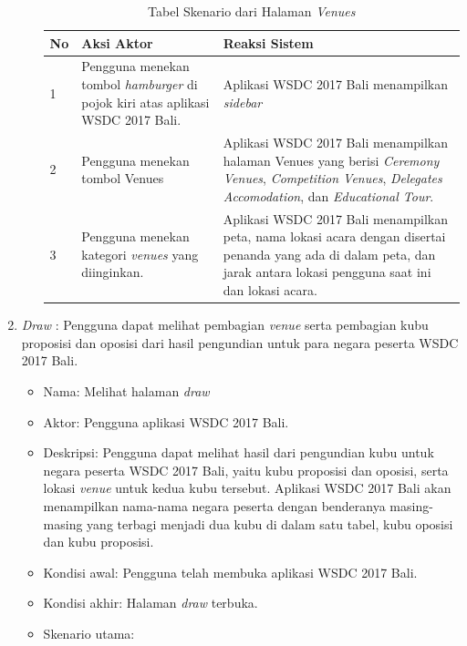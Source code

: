 \begin{enumerate}
\begin{itemize}
\begin{table}[H]
			\centering
			\begin{tabular}{|p{0.5cm}|p{7cm}|p{7cm}|}
				\hline
				No & Aksi Aktor                               & Reaksi Sistem                                          \\ \hline
				1  & Pengguna menekan tombol {\it hamburger} di pojok kiri atas aplikasi WSDC 2017 Bali. & Aplikasi WSDC 2017 Bali menampilkan {\it sidebar} \\ \hline
				2  & Pengguna menekan tombol Venues & Aplikasi WSDC 2017 Bali menampilkan halaman Venues yang berisi {\it Ceremony Venues}, {\it Competition Venues}, {\it Delegates Accomodation}, dan {\it Educational Tour}.\\ \hline
				3  & Pengguna menekan kategori {\it venues} yang diinginkan. & Aplikasi WSDC 2017 Bali menampilkan peta, nama lokasi acara dengan disertai penanda yang ada di dalam peta, dan jarak antara lokasi pengguna saat ini dan lokasi acara.\\ \hline
			\end{tabular}
			\caption{Tabel Skenario dari Halaman {\it Venues}}
			\label{table:skenarioHalamanVenues}
		\end{table}
	\end{itemize}
\newpage
	\item {\it Draw} : Pengguna dapat melihat pembagian {\it venue} serta pembagian kubu proposisi dan oposisi dari hasil pengundian untuk para negara peserta WSDC 2017 Bali.
	\begin{itemize}
		\item Nama: Melihat halaman {\it draw}
		\item Aktor: Pengguna aplikasi WSDC 2017 Bali.
		\item Deskripsi: Pengguna dapat melihat hasil dari pengundian kubu untuk negara peserta WSDC 2017 Bali, yaitu kubu proposisi dan oposisi, serta lokasi {\it venue} untuk kedua kubu tersebut. Aplikasi WSDC 2017 Bali akan menampilkan nama-nama negara peserta dengan benderanya masing-masing yang terbagi menjadi dua kubu di dalam satu tabel, kubu oposisi dan kubu proposisi.
		\item Kondisi awal: Pengguna telah membuka aplikasi WSDC 2017 Bali.
		\item Kondisi akhir: Halaman {\it draw} terbuka.
		\item Skenario utama: \\
		\begin{table}[H]
			\centering
			\begin{tabular}{|p{0.5cm}|p{7cm}|p{7cm}|}
				\hline

\end{tabular}
\end{table}
\end{itemize}
\end{enumerate}
